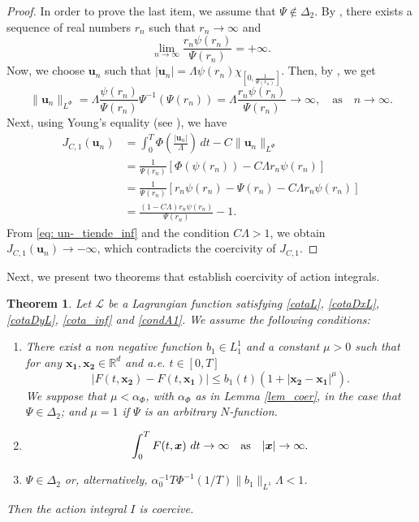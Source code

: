 \documentclass[twoside]{article}
\newtheorem{thm}{Theorem}[section]
\theoremstyle{remark}
\newcommand{\orlnor}{\|_{L^{\Phi}}}
\renewcommand{\b}[1]{\boldsymbol{#1}}
\newcommand{\rr}{\mathbb{R}}
\renewcommand{\leq}{\leqslant}
\begin{document}
\begin{proof}
In order to prove the last item, we assume that $\Psi \notin \Delta_2$. 
By \cite[Thm. 4.1]{KR},  there exists a sequence of real  numbers  $r_n$ such that
$r_n \to \infty$ and 
\begin{equation}\label{eq: un-_tiende_inf}
\lim\limits_{n \to \infty} \frac{r_n \psi(r_n)}{\Psi(r_n)}=+\infty.
\end{equation}
Now, we choose $\b{u}_n$ such that
$|\b{u}_n|=\Lambda\psi(r_n)\chi_{[0,\frac{1}{\Psi(r_n)}]}$. Then, 
by \cite[Eq. (9.11)]{KR}, we get 
\[
\|\b{u}_n\orlnor =\Lambda\frac{\psi(r_n)}{\Psi(r_n)}\Psi^{-1}(\Psi(r_n))=
\Lambda\frac{r_n\psi(r_n)}{\Psi(r_n)}\to \infty,\quad\text{as}\quad n \to \infty.
\]
Next, using Young's equality (see \cite[Eq. (2.7)]{KR}), we have
\[
\begin{split}
J_{C,1}(\b{u}_n)&=\int_0^T \Phi\left(\frac{|\b{u}_n|}{\Lambda}\right)\,dt-C\|\b{u}_n\orlnor\\
&=
\frac{1}{\Psi(r_n)}\left[\Phi(\psi(r_n))  -C\Lambda r_n\psi(r_n)\right]\\
&=
\frac{1}{\Psi(r_n)} \left[ r_n\psi(r_n)-\Psi(r_n)- C\Lambda r_n\psi(r_n) \right]\\
&=\frac{(1- C\Lambda) r_n\psi(r_n)}{\Psi(r_n)}-1.
\end{split}
\]
From \eqref{eq: un-_tiende_inf} and the condition $C\Lambda>1$, we obtain  $J_{C,1}(\b{u}_n)\to-\infty$, which contradicts the coercivity  of $J_{C,1}$.
\end{proof}



Next, we present two theorems that establish coercivity of action integrals. 



\begin{thm}\label{coercitividad1}
Let  $\mathcal{L}$ be a Lagrangian function satisfying \eqref{cotaL}, \eqref{cotaDxL}, \eqref{cotaDyL}, \eqref{cota_inf} and \eqref{condA1}. We assume the following conditions:
\begin{enumerate}
\item There exist a non negative function  $b_1 \in L^1_1$ and a constant $\mu>0$  such that for any $\b{x_1},\b{x_2}\in\rr^d$ and a.e. $t\in [0,T]$
\begin{equation}\label{holder_cont}
  \left| F(t,\b{x_2})- F(t,\b{x_1}) \right|\leq b_1(t)(1+|\b{x_2}-\b{x_1}|^{\mu}).
\end{equation}
We suppose that $\mu< \alpha_{\Phi}$,  with $\alpha_{\Phi}$ as in Lemma \ref{lem_coer}, in the case that $\Psi\in\Delta_2$; and $\mu=1$  if $\Psi$ is an  arbitrary $N$-function. 
\item
\begin{equation}\label{propiedad1coercividad}
\int_{0}^{T}F(t,\b{x})\ dt \rightarrow \infty \quad \hbox{as} \quad |\b{x}|\rightarrow \infty.
\end{equation}
\item\label{hipot_coer}  $\Psi\in\Delta_2$ or, alternatively, 
$\alpha_0^{-1}T\Phi^{-1}\left(1/T\right)\|b_1\|_{L^1}\Lambda<1$.
\end{enumerate}
Then  the action integral $I$ is coercive.
\end{thm}
\end{document}
